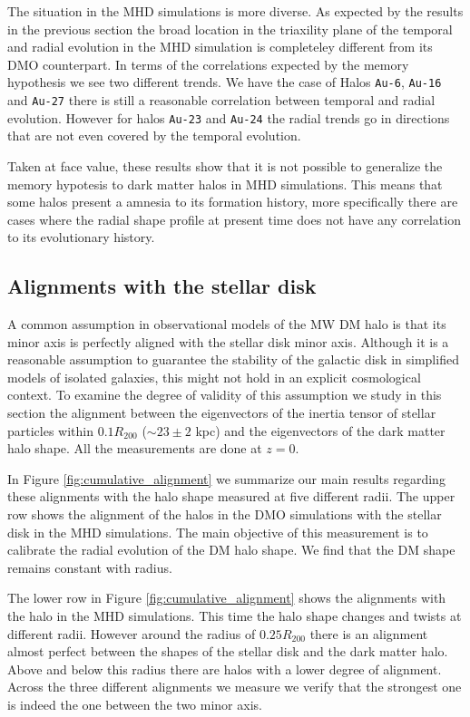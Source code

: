 \documentclass[a4paper,fleqn,usenatbib]{mnras}
\begin{document}
The situation in the MHD simulations is more diverse.
As expected by the results in the previous section the broad location
in the triaxility plane of the temporal and radial evolution in the
MHD simulation is completeley different from its DMO counterpart. 
In terms of the correlations expected by the memory hypothesis we see
two different trends.
We have the case of Halos \texttt{Au-6}, \texttt{Au-16} and
\texttt{Au-27} there is still a reasonable correlation between
temporal and radial evolution. 
However for halos \texttt{Au-23} and \texttt{Au-24} the radial trends
go in directions that are not even covered by the temporal evolution.

Taken at face value, these results show that it is not possible to
generalize the memory hypotesis to dark matter halos in MHD
simulations.
This means that some halos present a amnesia to its formation history,
more specifically there are cases where the radial shape profile at
present time does not have any correlation to its evolutionary
history. 


\subsection{Alignments with the stellar disk}


A common assumption in observational models of the MW DM halo is that
its minor axis is perfectly aligned with the stellar disk minor axis.
Although it is a reasonable assumption to guarantee the stability of
the galactic disk in simplified models of isolated galaxies, this
might not hold in an explicit cosmological context. 
To examine the degree of validity of this assumption we study in this
section the alignment between the eigenvectors of the inertia tensor of
stellar particles within $0.1R_{200}$ ($\sim 23\pm 2$ kpc) and the
eigenvectors of the dark matter halo shape.
All the measurements are done at $z=0$.

In Figure \ref{fig:cumulative_alignment} we summarize our main results
regarding these alignments with the halo shape measured at five
different radii.
The upper row shows the alignment of the halos in the DMO simulations
with the stellar disk in the MHD simulations.
The main objective of this measurement is to calibrate the radial
evolution of the DM halo shape. 
We find that the DM shape remains constant with radius.

The lower row in Figure \ref{fig:cumulative_alignment} shows the
alignments with the halo in the MHD simulations. 
This time the halo shape changes and twists at different radii.
However around the radius of $0.25R_{200}$ there is an alignment
almost perfect between the shapes of the stellar disk and the dark
matter halo. 
Above and below this radius there are halos with a lower degree of
alignment.
Across the three different alignments we measure we verify that the
strongest one is indeed the one between the two minor axis.
\end{document}
